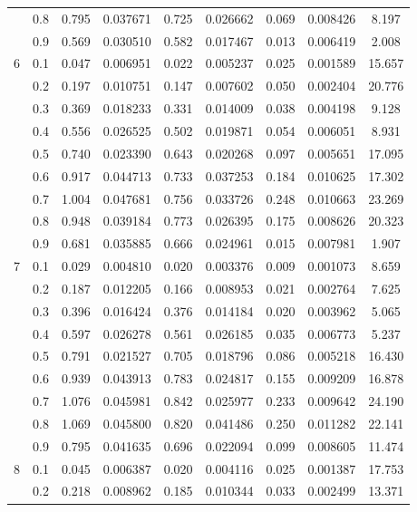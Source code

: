 \begin{longtable}{ | c | c || c | c | c | c | c | c | c | }
 & 0.8 & 0.795 & 0.037671 & 0.725 & 0.026662 & 0.069 & 0.008426 & 8.197 \\
 & 0.9 & 0.569 & 0.030510 & 0.582 & 0.017467 & 0.013 & 0.006419 & 2.008 \\
 \hline
\multirow{9}{*}{6} & 0.1 & 0.047 & 0.006951 & 0.022 & 0.005237 & 0.025 & 0.001589 & 15.657 \\
 & 0.2 & 0.197 & 0.010751 & 0.147 & 0.007602 & 0.050 & 0.002404 & 20.776 \\
 & 0.3 & 0.369 & 0.018233 & 0.331 & 0.014009 & 0.038 & 0.004198 & 9.128 \\
 & 0.4 & 0.556 & 0.026525 & 0.502 & 0.019871 & 0.054 & 0.006051 & 8.931 \\
 & 0.5 & 0.740 & 0.023390 & 0.643 & 0.020268 & 0.097 & 0.005651 & 17.095 \\
 & 0.6 & 0.917 & 0.044713 & 0.733 & 0.037253 & 0.184 & 0.010625 & 17.302 \\
 & 0.7 & 1.004 & 0.047681 & 0.756 & 0.033726 & 0.248 & 0.010663 & 23.269 \\
 & 0.8 & 0.948 & 0.039184 & 0.773 & 0.026395 & 0.175 & 0.008626 & 20.323 \\
 & 0.9 & 0.681 & 0.035885 & 0.666 & 0.024961 & 0.015 & 0.007981 & 1.907 \\
 \hline
\multirow{9}{*}{7} & 0.1 & 0.029 & 0.004810 & 0.020 & 0.003376 & 0.009 & 0.001073 & 8.659 \\
 & 0.2 & 0.187 & 0.012205 & 0.166 & 0.008953 & 0.021 & 0.002764 & 7.625 \\
 & 0.3 & 0.396 & 0.016424 & 0.376 & 0.014184 & 0.020 & 0.003962 & 5.065 \\
 & 0.4 & 0.597 & 0.026278 & 0.561 & 0.026185 & 0.035 & 0.006773 & 5.237 \\
 & 0.5 & 0.791 & 0.021527 & 0.705 & 0.018796 & 0.086 & 0.005218 & 16.430 \\
 & 0.6 & 0.939 & 0.043913 & 0.783 & 0.024817 & 0.155 & 0.009209 & 16.878 \\
 & 0.7 & 1.076 & 0.045981 & 0.842 & 0.025977 & 0.233 & 0.009642 & 24.190 \\
 & 0.8 & 1.069 & 0.045800 & 0.820 & 0.041486 & 0.250 & 0.011282 & 22.141 \\
 & 0.9 & 0.795 & 0.041635 & 0.696 & 0.022094 & 0.099 & 0.008605 & 11.474 \\
 \hline
\multirow{9}{*}{8} & 0.1 & 0.045 & 0.006387 & 0.020 & 0.004116 & 0.025 & 0.001387 & 17.753 \\
 & 0.2 & 0.218 & 0.008962 & 0.185 & 0.010344 & 0.033 & 0.002499 & 13.371 \\

\end{longtable}
